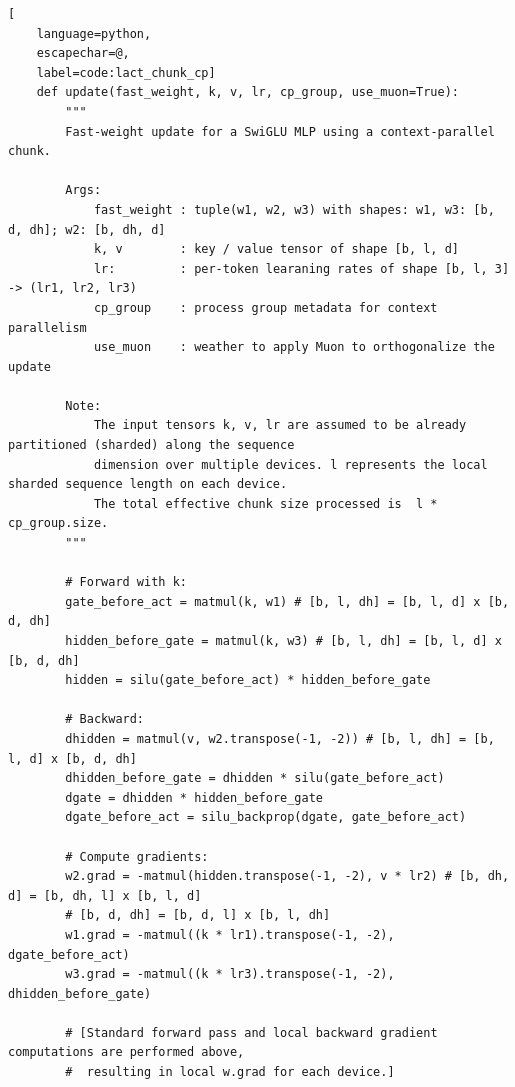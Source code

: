 \begin{algorithm}[t]

\caption{Large Chunk Test-Time Training Layer with Context Parallel Sharded inside chunk Pseudocode}\label{alg:lact_chunk_cp}
\newcommand{\hlbox}[1]{%
  \fboxsep=1.2pt\hspace*{-\fboxsep}\colorbox{blue!10}{\detokenize{#1}}%
}
\lstset{style=mocov3}
\begin{lstlisting}[
    language=python,
    escapechar=@,
    label=code:lact_chunk_cp]
    def update(fast_weight, k, v, lr, cp_group, use_muon=True):
        """
        Fast-weight update for a SwiGLU MLP using a context-parallel chunk. 

        Args:
            fast_weight : tuple(w1, w2, w3) with shapes: w1, w3: [b, d, dh]; w2: [b, dh, d]
            k, v        : key / value tensor of shape [b, l, d]
            lr:         : per-token learaning rates of shape [b, l, 3] -> (lr1, lr2, lr3)
            cp_group    : process group metadata for context parallelism
            use_muon    : weather to apply Muon to orthogonalize the update

        Note:
            The input tensors k, v, lr are assumed to be already partitioned (sharded) along the sequence 
            dimension over multiple devices. l represents the local sharded sequence length on each device.
            The total effective chunk size processed is  l * cp_group.size.
        """
        
        # Forward with k:
        gate_before_act = matmul(k, w1) # [b, l, dh] = [b, l, d] x [b, d, dh]
        hidden_before_gate = matmul(k, w3) # [b, l, dh] = [b, l, d] x [b, d, dh]
        hidden = silu(gate_before_act) * hidden_before_gate
        
        # Backward:
        dhidden = matmul(v, w2.transpose(-1, -2)) # [b, l, dh] = [b, l, d] x [b, d, dh]
        dhidden_before_gate = dhidden * silu(gate_before_act)
        dgate = dhidden * hidden_before_gate
        dgate_before_act = silu_backprop(dgate, gate_before_act)

        # Compute gradients: 
        w2.grad = -matmul(hidden.transpose(-1, -2), v * lr2) # [b, dh, d] = [b, dh, l] x [b, l, d]
        # [b, d, dh] = [b, d, l] x [b, l, dh]
        w1.grad = -matmul((k * lr1).transpose(-1, -2), dgate_before_act)
        w3.grad = -matmul((k * lr3).transpose(-1, -2), dhidden_before_gate)

        # [Standard forward pass and local backward gradient computations are performed above,
        #  resulting in local w.grad for each device.]


\end{lstlisting}
\end{algorithm}
